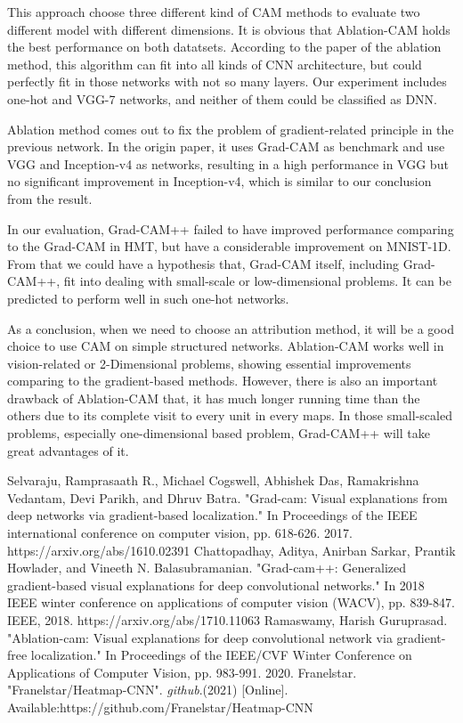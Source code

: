 \documentclass[conference]{IEEEtran}
\begin{document}
This approach choose three different kind of CAM methods to evaluate two different model with different dimensions. It is obvious that Ablation-CAM holds the best performance on both datatsets. According to the paper of the ablation method, this algorithm can fit into all kinds of CNN architecture, but could perfectly fit in those networks with not so many layers. Our experiment includes one-hot and VGG-7 networks, and neither of them could be classified as DNN.\par
Ablation method comes out to fix the problem of gradient-related principle in the previous network. In the origin paper, it uses Grad-CAM as benchmark and use VGG and Inception-v4 as networks, resulting in a high performance in VGG but no significant improvement in Inception-v4, which is similar to our conclusion from the result.\par
In our evaluation, Grad-CAM++ failed to have improved performance comparing to the Grad-CAM in HMT, but have a considerable improvement on MNIST-1D. From that we could have a hypothesis that, Grad-CAM itself, including Grad-CAM++, fit into dealing with small-scale or low-dimensional problems. It can be predicted to perform well in such one-hot networks.\par
As a conclusion, when we need to choose an attribution method, it will be a good choice to use CAM on simple structured networks. Ablation-CAM works well in vision-related or 2-Dimensional problems, showing essential improvements comparing to the gradient-based methods. However, there is also an important drawback of Ablation-CAM that, it has much longer running time than the others due to its complete visit to every unit in every maps. In those small-scaled problems, especially one-dimensional based problem, Grad-CAM++ will take great advantages of it.

\begin{thebibliography}{00}
Selvaraju, Ramprasaath R., Michael Cogswell, Abhishek Das, Ramakrishna Vedantam, Devi Parikh, and Dhruv Batra. "Grad-cam: Visual explanations from deep networks via gradient-based localization." In Proceedings of the IEEE international conference on computer vision, pp. 618-626. 2017. https://arxiv.org/abs/1610.02391
 Chattopadhay, Aditya, Anirban Sarkar, Prantik Howlader, and Vineeth N. Balasubramanian. "Grad-cam++: Generalized gradient-based visual explanations for deep convolutional networks." In 2018 IEEE winter conference on applications of computer vision (WACV), pp. 839-847. IEEE, 2018. https://arxiv.org/abs/1710.11063
 Ramaswamy, Harish Guruprasad. "Ablation-cam: Visual explanations for deep convolutional 
network via gradient-free localization." In Proceedings of the IEEE/CVF Winter Conference on Applications of Computer Vision, pp. 983-991. 2020. 
Franelstar. "Franelstar/Heatmap-CNN". \textit{github}.(2021) [Online]. Available:https://github.com/Franelstar/Heatmap-CNN


\end{thebibliography}
\end{document}
